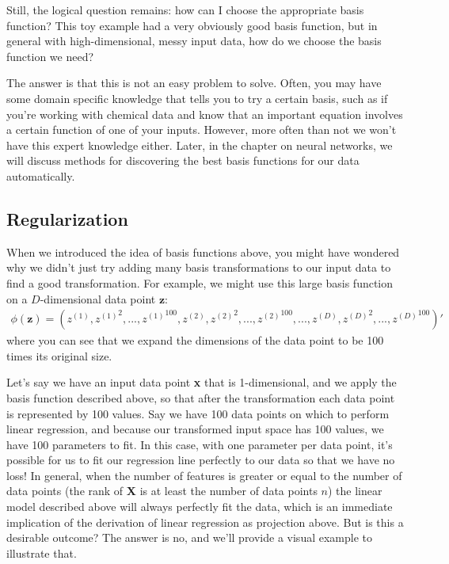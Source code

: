 Still, the logical question remains: how can I choose the appropriate basis function? This toy example had a very obviously good basis function, but in general with high-dimensional, messy input data, how do we choose the basis function we need?

The answer is that this is not an easy problem to solve. Often, you may have some domain specific knowledge that tells you to try a certain basis, such as if you're working with chemical data and know that an important equation involves a certain function of one of your inputs. However, more often than not we won't have this expert knowledge either. Later, in the chapter on neural networks, we will discuss methods for discovering the best basis functions for our data automatically.

\subsection{Regularization}
When we introduced the idea of basis functions above, you might have wondered why we didn't just try adding many basis transformations to our input data to find a good transformation. For example, we might use this large basis function on a $D$-dimensional data point $\textbf{z}$:
\begin{align*}
    \phi(\textbf{z}) = (z^{(1)}, {z^{(1)}}^{2}, ..., {z^{(1)}}^{100}, z^{(2)}, {z^{(2)}}^{2}, ..., {z^{(2)}}^{100}, ..., z^{(D)}, {z^{(D)}}^{2}, ..., {z^{(D)}}^{100})'
\end{align*}
where you can see that we expand the dimensions of the data point to be 100 times its original size.

Let's say we have an input data point \textbf{x} that is 1-dimensional, and we apply the basis function described above, so that after the transformation each data point is represented by 100 values. Say we have 100 data points on which to perform linear regression, and because our transformed input space has 100 values, we have 100 parameters to fit. In this case, with one parameter per data point, it's possible for us to fit our regression line perfectly to our data so that we have no loss! In general, when the number of features is greater or equal to the number of data points (the rank of \textbf{X} is at least the number of data points $n$) the linear model described above will always perfectly fit the data, which is an immediate implication of the derivation of linear regression as projection above. But is this a desirable outcome? The answer is no, and we'll provide a visual example to illustrate that.

